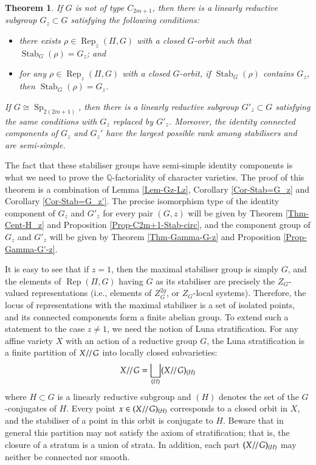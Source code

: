 \documentclass[11pt,oneside,dvipsnames]{amsart}
\theoremstyle{plain}
\newtheorem{ThmA}{Theorem}
\theoremstyle{definition}
\theoremstyle{named}
\DeclareMathOperator{\Rep}{Rep}
\DeclareMathOperator{\Sp}{Sp}
\DeclareMathOperator{\Stab}{Stab}
\DeclareMathOperator{\ds}{\!/\mkern-2mu/\mkern-2mu}
\begin{document}
\begin{ThmA}\label{Thm-A}
If $G$ is not of type $C_{2m+1}$, then there is a linearly reductive subgroup $G_z\subset G$ satisfying the following conditions:
\begin{itemize}
\item there exists $\rho\in \Rep_z(\Pi,G)$ with a closed $G$-orbit such that $\Stab_G(\rho)=G_z$; and
\item for any $\rho\in \Rep_z(\Pi,G)$ with a closed $G$-orbit, if $\Stab_G(\rho)$ contains $ G_z$, then $\Stab_G(\rho)=G_z$.
\end{itemize}  
If $G\cong\Sp_{2(2m+1)}$, then there is a linearly reductive subgroup $G'_z\subset G$ satisfying the same conditions with $G_z$ replaced by $G'_z$. Moreover, the identity connected components of $G_z$ and $G_z'$ have the largest possible rank among stabilisers and are semi-simple.
\end{ThmA}

The fact that these stabiliser groups have semi-simple identity components is what we need to prove the $\mathbb{Q}$-factoriality of character varieties. The proof of this theorem is a combination of Lemma \ref{Lem-Gz-Lz}, Corollary \ref{Cor-Stab=G_z} and Corollary \ref{Cor-Stab=G_z'}. The precise isomorphism type of the identity component of $G_z$ and $G'_z$ for every pair $(G,z)$ will be given by Theorem \ref{Thm-Cent-H_z} and Proposition \ref{Prop-C2m+1-Stab-circ}, and the component group of $G_z$ and $G'_z$ will be given by Theorem \ref{Thm-Gamma-G-z} and Proposition \ref{Prop-Gamma-G'-z}.

It is easy to see that if $z=1$, then the maximal stabiliser group is simply $G$, and the elements of $\Rep(\Pi,G)$ having $G$ as its stabiliser are precisely the $Z_G$-valued representations (i.e., elements of $Z_G^{2g}$, or $Z_G$-local systems). Therefore, the locus of representations with the maximal stabiliser is a set of isolated points, and its connected components form a finite abelian group. To extend such a statement to the case $z\ne 1$, we need the notion of Luna stratification. For any affine variety $X$ with an action of a reductive group $G$, the Luna stratification is a finite partition of $X\ds G$ into locally closed subvarieties:
$$
X\ds G=\bigsqcup_{(H)}(X\ds G)_{(H)}
$$
where $H\subset G $ is a linearly reductive subgroup and $(H)$ denotes the set of the $G$-conjugates of $H$. Every point $x\in (X\ds G)_{(H)}$ corresponds to a closed orbit in $X$, and the stabiliser of a point in this orbit is conjugate to $H$. Beware that in general this partition may not satisfy the axiom of stratification; that is, the closure of a stratum is a union of strata. In addition, each part $(X\ds G)_{(H)}$ may neither be connected nor smooth.
\end{document}
